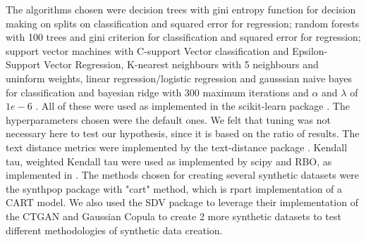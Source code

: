 The algorithms chosen were decision trees with gini entropy function for decision making on splits on classification and squared error for regression; random forests with 100 trees and gini criterion for classification and squared error for regression; support vector machines with C-support Vector classification and Epsilon-Support Vector Regression, K-nearest neighbours with 5 neighbours and uninform weights, linear regression/logistic regression and gausssian naive bayes for classification and bayesian ridge with 300 maximum iterations and $\alpha$ and $\lambda$ of $1e-6$ . All of these were used as implemented in the scikit-learn package \cite{scikit-learn}. The hyperparameters chosen were the default ones. We felt that tuning was not necessary here to test our hypothesis, since it is based on the ratio of results.
The text distance metrics were implemented by the text-distance package \cite{orsiniumTextdistanceComputeDistance}. Kendall tau, weighted Kendall tau were used as implemented by scipy \cite{virtanenSciPyFundamentalAlgorithms2020a} and RBO, as implemented in \cite{chenRankbiasedOverlapRBO2023}.
The methods chosen for creating several synthetic datasets were the synthpop package \cite{synthpop} with "cart" method, which is rpart implementation of a CART model. We also used  the SDV package \cite{SDV} to leverage their implementation of the CTGAN and Gaussian Copula to create 2 more synthetic datasets to test different methodologies of synthetic data creation.



